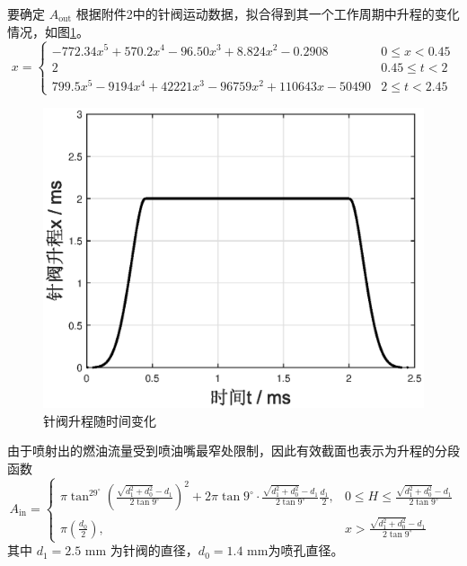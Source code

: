 \documentclass[12pt,a4paper]{article}
\begin{document}
要确定 $A_{\text{out}}$ 根据附件2中的针阀运动数据，拟合得到其一个工作周期中升程的变化情况，如图\ref{needle}。
\begin{equation}
\label{x-t}
x=\left\{\begin{array}{ll}
 -772.34x^5+570.2x^4-96.50x^3+8.824x^2-0.2908&0\leq x<0.45\\
2&0.45\leq t<2\\
799.5x^5-9194x^4+42221x^3-96759x^2+110643x-50490&2\leq t<2.45
\end{array}\right.
\end{equation}
\begin{figure}[h]
\centering
\includegraphics[scale=0.75]{needle.eps}
\caption{针阀升程随时间变化}\label{needle}
\end{figure}

由于喷射出的燃油流量受到喷油嘴最窄处限制，因此有效截面也表示为升程的分段函数
\begin{equation}
\label{Ain}
A_{\text{in}}=\left\{\begin{array}{ll}
\pi \tan^29^{\circ}(\frac{\sqrt{d_1^2+d_0^2}-d_1}{2\tan 9^{\circ}})^2+2\pi\tan 9^{\circ}\cdot\frac{\sqrt{d_1^2+d_0^2}-d_1}{2\tan 9^{\circ}}\frac{d_1}{2},&0\leq H\leq \frac{\sqrt{d_1^2+d_0^2}-d_1}{2\tan 9^{\circ}}\\
\pi(\frac{d_0}{2}),&x>\frac{\sqrt{d_1^2+d_0^2}-d_1}{2\tan 9^{\circ}}
\end{array}\right.
\end{equation}
其中 $d_1=2.5$ mm 为针阀的直径，$d_0=1.4$ mm为喷孔直径。
\end{document}

